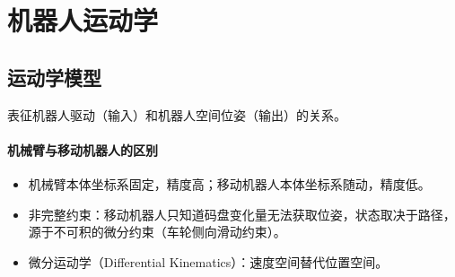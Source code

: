 \documentclass[
12pt, %
a4paper, 
oneside, %
headinclude,footinclude, %
]{scrartcl}
\begin{document}
\begin{comment}
\subsection[轮式机器人]{轮式机器人}
\paragraph{研究意义}
\begin{itemize}
\item 人造环境下高效：滚动摩擦，无重心起伏。
\item 结构简单，可靠性高，成本低。
\item 控制简单，系统复杂度低。
\end{itemize}
\paragraph{轮数对稳定性的影响}
轮数增加，由动态稳定向静态稳定过度。
\begin{itemize}
\item 动态稳定：执行器停止工作摔倒。倒立摆模型。    
\item 静态稳定：执行器停止工作不摔倒。陀螺效应，随动轮效应。
\end{itemize}
\end{comment}
\section{机器人运动学}
\subsection[运动学模型]{运动学模型}
表征机器人驱动（输入）和机器人空间位姿（输出）的关系。
\paragraph{机械臂与移动机器人的区别}
\begin{itemize}
\item 机械臂本体坐标系固定，精度高；移动机器人本体坐标系随动，精度低。
\item 非完整约束：移动机器人只知道码盘变化量无法获取位姿，状态取决于路径，源于不可积的微分约束（车轮侧向滑动约束）。
\item 微分运动学（Differential Kinematics）：速度空间替代位置空间。
\end{itemize}
\end{document}
